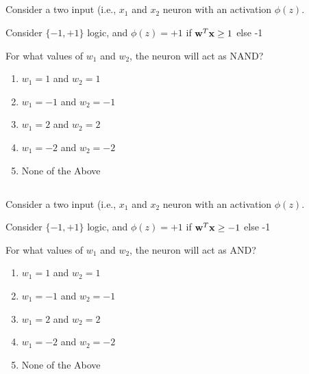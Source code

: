 \begin{frame}
\section{}
  Consider a two input (i.e., $x_1$ and $x_2$ neuron with an activation $\phi(z)$.

  Consider $\{-1,+1\}$ logic, and $\phi(z) = +1$ if ${\bf w}^T{\bf x} \geq 1$ else -1

  For what values of $w_1$ and $w_2$, the neuron will act as NAND?
    \begin{enumerate}[label=(\Alph*)]
      \item $w_1=1$ and $w_2=1$
     \item $w_1=-1$ and $w_2=-1$
     \item $w_1=2$ and $w_2=2$
     \item $w_1=-2$ and $w_2=-2$
     \item None of the Above    %
    \end{enumerate}
\end{frame}

\begin{frame}
\section{}
  Consider a two input (i.e., $x_1$ and $x_2$ neuron with an activation $\phi(z)$.

  Consider $\{-1,+1\}$ logic, and $\phi(z) = +1$ if ${\bf w}^T{\bf x} \geq -1$ else -1

  For what values of $w_1$ and $w_2$, the neuron will act as AND?
    \begin{enumerate}[label=(\Alph*)]
      \item $w_1=1$ and $w_2=1$
     \item $w_1=-1$ and $w_2=-1$
     \item $w_1=2$ and $w_2=2$
     \item $w_1=-2$ and $w_2=-2$
     \item None of the Above     %
    \end{enumerate}
\end{frame}

